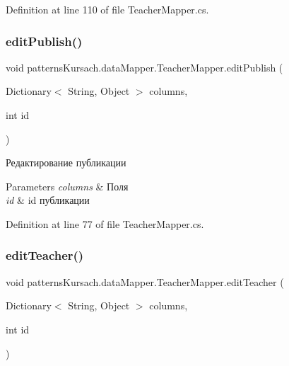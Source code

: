 Definition at line 110 of file Teacher\+Mapper.\+cs.

\mbox{\label{classpatterns_kursach_1_1data_mapper_1_1_teacher_mapper_a648d4abde78e6307655e63dd5e06a3e1}} 
\subsubsection{\texorpdfstring{edit\+Publish()}{editPublish()}}
{\footnotesize\ttfamily void patterns\+Kursach.\+data\+Mapper.\+Teacher\+Mapper.\+edit\+Publish (\begin{DoxyParamCaption}\item[{Dictionary$<$ String, Object $>$}]{columns,  }\item[{int}]{id }\end{DoxyParamCaption})}



Редактирование публикации 


\begin{DoxyParams}{Parameters}
{\em columns} & Поля\\
\hline
{\em id} & id публикации\\
\hline
\end{DoxyParams}


Definition at line 77 of file Teacher\+Mapper.\+cs.

\mbox{\label{classpatterns_kursach_1_1data_mapper_1_1_teacher_mapper_aecb5c0f2f2a2bad763f94cb67f27ba07}} 
\subsubsection{\texorpdfstring{edit\+Teacher()}{editTeacher()}}
{\footnotesize\ttfamily void patterns\+Kursach.\+data\+Mapper.\+Teacher\+Mapper.\+edit\+Teacher (\begin{DoxyParamCaption}\item[{Dictionary$<$ String, Object $>$}]{columns,  }\item[{int}]{id }\end{DoxyParamCaption})}



